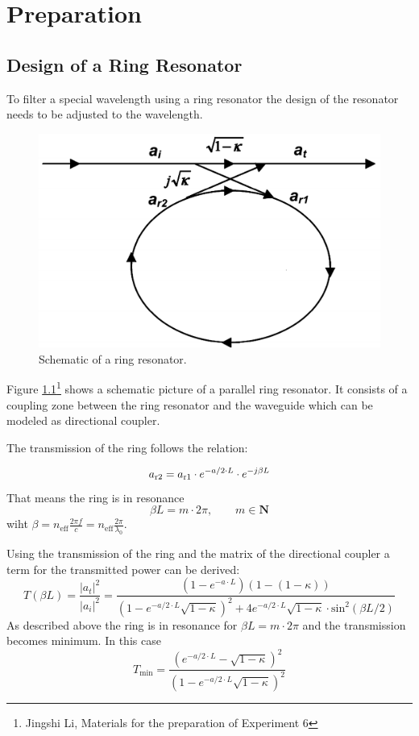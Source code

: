 \chapter{Preparation}


\section{Design of a Ring Resonator}
To filter a special wavelength using a ring resonator the design of the resonator needs to be adjusted to the wavelength.
\begin{figure}[h]%
\centering
\includegraphics[width=.5\columnwidth]{Grafiken/Resonator.png}%
\caption{Schematic of a ring resonator.}%
\label{fig:p1_ring}%
\end{figure} 
Figure \ref{fig:p1_ring}\footnote[1]{Jingshi Li, Materials for the preparation of Experiment 6} shows a schematic picture of a parallel ring resonator. It consists of a coupling zone between the ring resonator and the waveguide which can be modeled as directional coupler\footnotemark[1].

The transmission of the ring follows the relation:

\begin{equation}
a_{\mathrm{r2}}=a_{\mathrm{r1}}\cdot e^{-a/2\cdot L}\cdot e^{-j\beta L}
\label{eq:}
\end{equation}
That means the ring is in resonance
\begin{equation}
\beta L = m\cdot2\pi,\qquad m \in \mathbf{N}
\label{eq:}
\end{equation}
wiht $\beta = n_{\mathrm{eff}} \frac{2\pi f}{c} = n_{\mathrm{eff}} \frac{2\pi}{\lambda_0}$.

Using the transmission of the ring and the matrix of the directional coupler a term for the transmitted power can be derived\footnotemark[1]:
\begin{equation}
T(\beta L) = \frac{|a_t|^2}{|a_i|^2}= \frac{(1-e^{-a\cdot L})(1-(1-\kappa))}{(1-e^{-a/2\cdot L}\sqrt{1-\kappa})^2+4e^{-a/2\cdot L}\sqrt{1-\kappa}\cdot\mathrm{sin}^2(\beta L / 2)}
\label{eq:}
\end{equation}
As described above the ring is in resonance for $\beta L = m\cdot2\pi$ and the transmission becomes minimum. 
In this case
\begin{equation}
T_{\mathrm{min}}=\frac{(e^{-a/2\cdot L} - \sqrt{1-\kappa})^2}{(1 - e^{-a/2\cdot L}\sqrt{1-\kappa})^2}
\label{eq:}
\end{equation}

